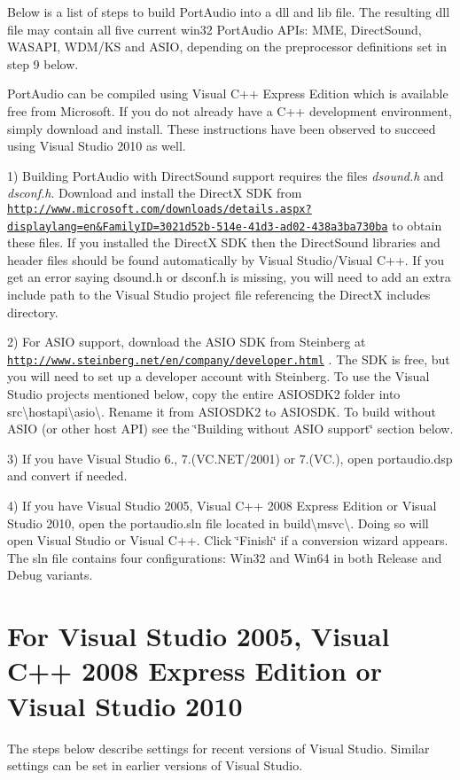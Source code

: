 Below is a list of steps to build Port\+Audio into a dll and lib file. The resulting dll file may contain all five current win32 Port\+Audio A\+P\+Is\+: M\+ME, Direct\+Sound, W\+A\+S\+A\+PI, W\+D\+M/\+KS and A\+S\+IO, depending on the preprocessor definitions set in step 9 below.

Port\+Audio can be compiled using Visual C++ Express Edition which is available free from Microsoft. If you do not already have a C++ development environment, simply download and install. These instructions have been observed to succeed using Visual Studio 2010 as well.

1) Building Port\+Audio with Direct\+Sound support requires the files {\itshape dsound.\+h} and {\itshape dsconf.\+h}. Download and install the DirectX S\+DK from \href{http://www.microsoft.com/downloads/details.aspx?displaylang=en&FamilyID=3021d52b-514e-41d3-ad02-438a3ba730ba}{\tt http\+://www.\+microsoft.\+com/downloads/details.\+aspx?displaylang=en\&\+Family\+I\+D=3021d52b-\/514e-\/41d3-\/ad02-\/438a3ba730ba} to obtain these files. If you installed the DirectX S\+DK then the Direct\+Sound libraries and header files should be found automatically by Visual Studio/\+Visual C++. If you get an error saying dsound.\+h or dsconf.\+h is missing, you will need to add an extra include path to the Visual Studio project file referencing the DirectX includes directory.

2) For A\+S\+IO support, download the A\+S\+IO S\+DK from Steinberg at \href{http://www.steinberg.net/en/company/developer.html}{\tt http\+://www.\+steinberg.\+net/en/company/developer.\+html} . The S\+DK is free, but you will need to set up a developer account with Steinberg. To use the Visual Studio projects mentioned below, copy the entire A\+S\+I\+O\+S\+D\+K2 folder into src\textbackslash{}hostapi\textbackslash{}asio\textbackslash{}. Rename it from A\+S\+I\+O\+S\+D\+K2 to A\+S\+I\+O\+S\+DK. To build without A\+S\+IO (or other host A\+PI) see the \char`\"{}\+Building without A\+S\+I\+O support\char`\"{} section below.

3) If you have Visual Studio 6., 7.(V\+C.\+N\+ET/2001) or 7.(V\+C.), open portaudio.\+dsp and convert if needed.

4) If you have Visual Studio 2005, Visual C++ 2008 Express Edition or Visual Studio 2010, open the portaudio.\+sln file located in build\textbackslash{}msvc\textbackslash{}. Doing so will open Visual Studio or Visual C++. Click \char`\"{}\+Finish\char`\"{} if a conversion wizard appears. The sln file contains four configurations\+: Win32 and Win64 in both Release and Debug variants.\hypertarget{compile_windows_comp_win1}{}\section{For Visual Studio 2005, Visual C++ 2008 Express Edition or Visual Studio 2010}\label{compile_windows_comp_win1}
The steps below describe settings for recent versions of Visual Studio. Similar settings can be set in earlier versions of Visual Studio.

